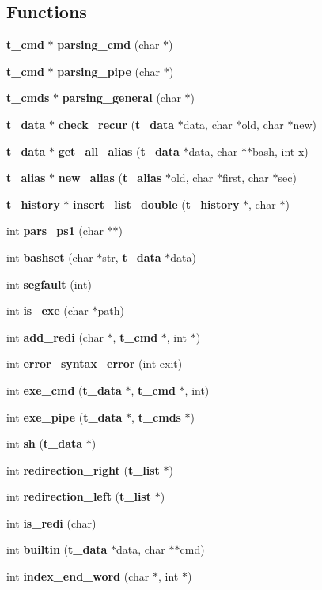 \subsection*{Functions}
\begin{DoxyCompactItemize}
\item 
{\bf t\-\_\-cmd} $\ast$ {\bf parsing\-\_\-cmd} (char $\ast$)
\item 
{\bf t\-\_\-cmd} $\ast$ {\bf parsing\-\_\-pipe} (char $\ast$)
\item 
{\bf t\-\_\-cmds} $\ast$ {\bf parsing\-\_\-general} (char $\ast$)
\item 
{\bf t\-\_\-data} $\ast$ {\bf check\-\_\-recur} ({\bf t\-\_\-data} $\ast$data, char $\ast$old, char $\ast$new)
\item 
{\bf t\-\_\-data} $\ast$ {\bf get\-\_\-all\-\_\-alias} ({\bf t\-\_\-data} $\ast$data, char $\ast$$\ast$bash, int x)
\item 
{\bf t\-\_\-alias} $\ast$ {\bf new\-\_\-alias} ({\bf t\-\_\-alias} $\ast$old, char $\ast$first, char $\ast$sec)
\item 
{\bf t\-\_\-history} $\ast$ {\bf insert\-\_\-list\-\_\-double} ({\bf t\-\_\-history} $\ast$, char $\ast$)
\item 
int {\bf pars\-\_\-ps1} (char $\ast$$\ast$)
\item 
int {\bf bashset} (char $\ast$str, {\bf t\-\_\-data} $\ast$data)
\item 
int {\bf segfault} (int)
\item 
int {\bf is\-\_\-exe} (char $\ast$path)
\item 
int {\bf add\-\_\-redi} (char $\ast$, {\bf t\-\_\-cmd} $\ast$, int $\ast$)
\item 
int {\bf error\-\_\-syntax\-\_\-error} (int exit)
\item 
int {\bf exe\-\_\-cmd} ({\bf t\-\_\-data} $\ast$, {\bf t\-\_\-cmd} $\ast$, int)
\item 
int {\bf exe\-\_\-pipe} ({\bf t\-\_\-data} $\ast$, {\bf t\-\_\-cmds} $\ast$)
\item 
int {\bf sh} ({\bf t\-\_\-data} $\ast$)
\item 
int {\bf redirection\-\_\-right} ({\bf t\-\_\-list} $\ast$)
\item 
int {\bf redirection\-\_\-left} ({\bf t\-\_\-list} $\ast$)
\item 
int {\bf is\-\_\-redi} (char)
\item 
int {\bf builtin} ({\bf t\-\_\-data} $\ast$data, char $\ast$$\ast$cmd)
\item 
int {\bf index\-\_\-end\-\_\-word} (char $\ast$, int $\ast$)
$$
\end{DoxyCompactItemize}
